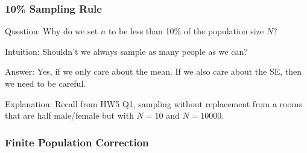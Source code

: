 \documentclass[handout]{beamer}
\newcommand{\blue}[1]{\textcolor{blue2}{#1}}
\begin{document}
\begin{frame}[fragile]
\frametitle{10\% Sampling Rule}

\blue{Question}: Why do we set $n$ to be less than 10\% of the population size $N?$

\pause\vspace{0.5cm}

\blue{Intuition}: Shouldn't we always sample as many people as we can?

\pause\vspace{0.5cm}

\blue{Answer}: Yes, if we only care about the mean.  If we also care about the SE, then we need to be careful.  

\pause\vspace{0.5cm}

\blue{Explanation}:  Recall from HW5 Q1, sampling without replacement from a rooms that are half male/female but with $N=10$ and $N=10000$.  

\end{frame}


\begin{frame}[fragile]
\frametitle{Finite Population Correction}

\end{frame}
\end{document}
